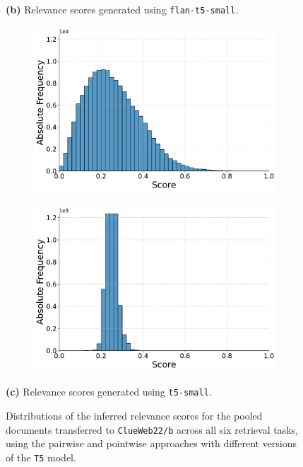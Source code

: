 \begin{figure}[t!]
    \vspace{-0.5cm}
    \textbf{(b)} Relevance scores generated using \texttt{flan-t5-small}.
    \vspace{0.5cm}

    \begin{subfigure}[b]{0.49\textwidth}
        \centering
        \includegraphics[width=\textwidth]{graphics/seaborn/pairwise_cw22_score_distribution_t5-small.pdf}
        \label{fig:pairwise_t5-small}
    \end{subfigure}
    \hfill
    \begin{subfigure}[b]{0.49\textwidth}
        \centering
        \includegraphics[width=\textwidth]{graphics/seaborn/pointwise_cw22_score_distribution_t5-small.pdf}
        \label{fig:pointwise_t5-small}
    \end{subfigure}

    \vspace{-0.5cm}
    \textbf{(c)} Relevance scores generated using \texttt{t5-small}.
    \vspace{0.5cm}

    \caption{Distributions of the inferred relevance scores for the pooled documents transferred to \texttt{ClueWeb22/b} across all six retrieval tasks, using the pairwise and pointwise approaches with different versions of the \texttt{T5} model.}
    \label{fig:score-distributions-cw22}
\end{figure}